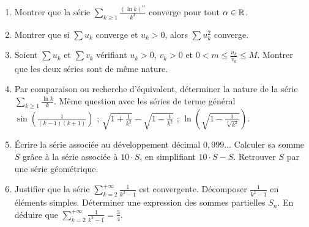 \begin{frame}
\begin{miniexercice}
\begin{enumerate}

  \item Montrer que la série 
  $\sum_{k\geq1} \frac{(\ln k)^\alpha}{k^3}$ converge pour tout $\alpha \in \mathbb{R}$.
  
  \item Montrer que si $\sum u_k$ converge et $u_k>0$, alors $\sum u_k^2$ converge.

  \item Soient  $\sum u_k$ et $\sum v_k$ vérifiant $u_k>0$, $v_k>0$ et $0<m \le \frac{u_k}{v_k} \le M$.
  Montrer que les deux séries sont de même nature.

  \item Par comparaison ou recherche d'équivalent, déterminer la nature de la série
  $\sum_{k \ge 1} \frac{\ln k}{k}$.
  Même question avec les séries de terme général 
  $\sin \left(\frac{1}{(k-1)(k+1)}\right)$ ;
  $\sqrt{1+\frac{1}{k^2}}-\sqrt{1-\frac{1}{k^2}}$ ; 
  $\ln\left(\sqrt{1-\frac{1}{\sqrt[3]{k^2}}}\right)$.
  
  
  \item \'Ecrire la série associée au développement décimal $0,999\ldots$ Calculer sa somme $S$ grâce à la série associée à $10 \cdot S$, en simplifiant $10 \cdot S - S$. Retrouver $S$ par une série géométrique.

  \item Justifier que la série $\sum_{k=2}^{+\infty} \frac{1}{k^2-1}$ est convergente.
  Décomposer $\frac{1}{k^2-1}$ en éléments simples. 
  Déterminer une expression des sommes partielles $S_n$.
  En déduire que $\sum_{k=2}^{+\infty} \frac{1}{k^2-1} = \frac34$.

\end{enumerate}
\end{miniexercice}
\end{frame}

